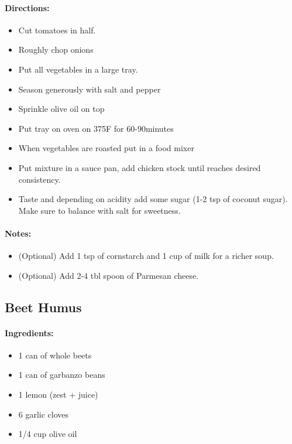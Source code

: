 \documentclass{article}
\begin{document}
\paragraph{Directions:}
\begin{itemize}
	\item Cut tomatoes in half.
	\item Roughly chop onions
	\item Put all vegetables in a large tray.
	\item Season generously with salt and pepper
	\item Sprinkle olive oil on top
	\item Put tray on oven on 375F for 60-90minutes
	\item When vegetables are roasted put in a food mixer
	\item Put mixture in a sauce pan, add chicken stock until reaches desired consistency.
	\item Taste and depending on acidity add some sugar (1-2 tsp of coconut sugar). Make sure to balance with salt for sweetness.
\end{itemize}

\paragraph{Notes:}
\begin{itemize}
	\item (Optional) Add 1 tsp of cornstarch and 1 cup of milk for a richer soup.
	\item (Optional) Add 2-4 tbl spoon of Parmesan cheese.
\end{itemize}

\subsection{Beet Humus}

\paragraph{Ingredients:}

\begin{itemize}
	\item 1 can of whole beets
	\item 1 can of garbanzo beans
	\item 1 lemon (zest + juice)
	\item 6 garlic cloves
	\item 1/4 cup olive oil
\end{itemize}
\end{document}
